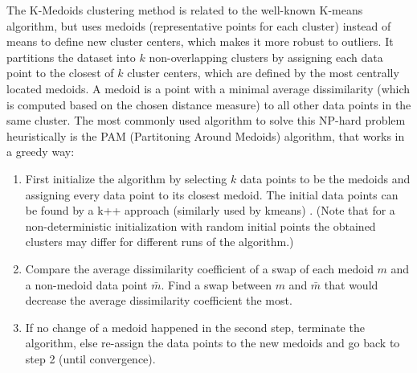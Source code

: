 \marginnote{\textcolor{blue}{Jonas Elpelt}}

The K-Medoids clustering method is related to the well-known K-means algorithm, but uses medoids (representative points for each cluster) instead of means to define new cluster centers, which makes it more robust to outliers\cite{Jin2010}. It partitions the dataset into $k$ non-overlapping clusters by assigning each data point to the closest of $k$ cluster centers, which are defined by the most centrally located medoids. A medoid is a point with a minimal average dissimilarity (which is computed based on the chosen distance measure) to all other data points in the same cluster. The most commonly used algorithm to solve this NP-hard problem heuristically is the PAM (Partitoning Around Medoids) algorithm, that works in a greedy way: \cite{kaufman2009finding} \\
\begin{enumerate}
	\item First initialize the algorithm by selecting $k$ data points to be the medoids and assigning every data point to its closest medoid. The initial data points can be found by a k++ approach (similarly used by kmeans) \cite{scikit-learn-extra}. (Note that for a non-deterministic initialization with random initial points the obtained clusters may differ for different runs of the algorithm.) \\
	\item Compare the average dissimilarity coefficient of a swap of each medoid $m$ and a non-medoid data point $\bar{m}$. Find a swap between $m$ and $\bar{m}$ that would decrease the average dissimilarity coefficient the most. 
	\item If no change of a medoid happened in the second step, terminate the algorithm, else re-assign the data points to the new medoids and go back to step 2 (until convergence). 
\end{enumerate}
